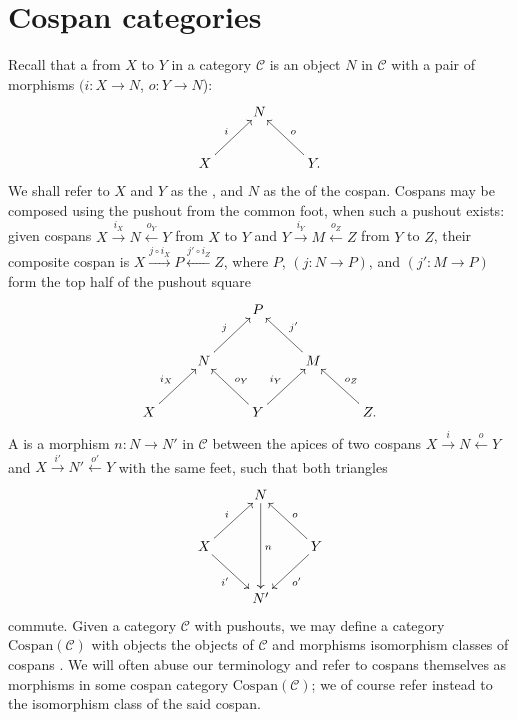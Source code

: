 \section{Cospan categories}

Recall that a  from $X$ to $Y$ in a category $\mathcal C$ is an
object $N$ in $\mathcal C$ with a pair of morphisms $(i\colon  X \to N$, $o\colon  Y \to
N$):
\[
  \xymatrix{
    & N \\
    X \ar[ur]^{i} && Y. \ar[ul]_{o}
  }
\]
We shall refer to $X$ and $Y$ as the , and $N$ as the
 of the cospan.  Cospans may be composed using the pushout from
the common foot, when such a pushout exists: given cospans $X
\stackrel{i_X}{\longrightarrow} N \stackrel{o_Y}{\longleftarrow} Y$ from $X$ to
$Y$ and $Y \stackrel{i_Y}{\longrightarrow} M \stackrel{o_Z}{\longleftarrow} Z$
from $Y$ to $Z$, their composite cospan is $X \stackrel{j \circ
i_X}{\longrightarrow} P \stackrel{j'\circ i_Z}{\longleftarrow} Z$, where $P$,
$(j\colon  N \to P)$, and $(j'\colon  M \to P)$ form the top half of the pushout square
\[
  \xymatrix{
    && P \\
    & N \ar[ur]^j && M \ar[ul]_{j'} \\
    X \ar[ur]^{i_X} && Y \ar[ul]_{o_Y} \ar[ur]^{i_Y} && Z. \ar[ul]_{o_Z}
  }
\]
A  is a morphism $n\colon  N \to N'$ in $\mathcal C$ between
the apices of two cospans $X \stackrel{i}{\longrightarrow} N
\stackrel{o}{\longleftarrow} Y$ and $X \stackrel{i'}{\longrightarrow} N'
\stackrel{o'}{\longleftarrow} Y$ with the same feet, such that both triangles 
\[
  \xymatrix{
    & N \ar[dd]^n  \\
    X \ar[ur]^{i} \ar[dr]_{i'} && Y \ar[ul]_{o} \ar[dl]^{o'}\\
    & N'
  }
\]
commute. Given a category $\mathcal C$ with pushouts, we may define a category
$\mathrm{Cospan}(\mathcal C)$ with objects the objects of $\mathcal C$ and
morphisms isomorphism classes of cospans \cite{Be}. We will often abuse our
terminology and refer to cospans themselves as morphisms in some cospan
category $\mathrm{Cospan}(\mathcal C)$; we of course refer instead to the
isomorphism class of the said cospan.

